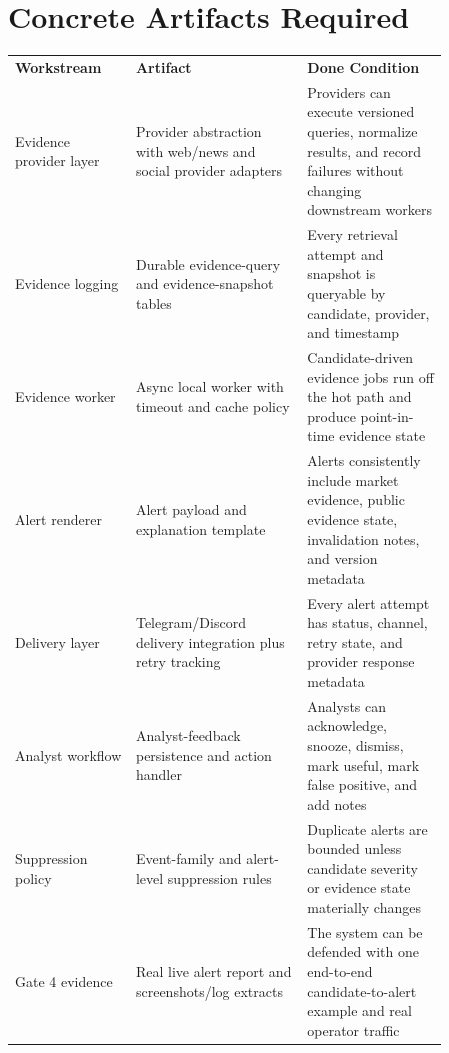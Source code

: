 \documentclass{article}
\begin{document}
\section*{Concrete Artifacts Required}
\begin{longtable}{p{0.24\linewidth}p{0.34\linewidth}p{0.28\linewidth}}
\textbf{Workstream} & \textbf{Artifact} & \textbf{Done Condition} \\
Evidence provider layer & Provider abstraction with web/news and social provider adapters & Providers can execute versioned queries, normalize results, and record failures without changing downstream workers \\
Evidence logging & Durable evidence-query and evidence-snapshot tables & Every retrieval attempt and snapshot is queryable by candidate, provider, and timestamp \\
Evidence worker & Async local worker with timeout and cache policy & Candidate-driven evidence jobs run off the hot path and produce point-in-time evidence state \\
Alert renderer & Alert payload and explanation template & Alerts consistently include market evidence, public evidence state, invalidation notes, and version metadata \\
Delivery layer & Telegram/Discord delivery integration plus retry tracking & Every alert attempt has status, channel, retry state, and provider response metadata \\
Analyst workflow & Analyst-feedback persistence and action handler & Analysts can acknowledge, snooze, dismiss, mark useful, mark false positive, and add notes \\
Suppression policy & Event-family and alert-level suppression rules & Duplicate alerts are bounded unless candidate severity or evidence state materially changes \\
Gate 4 evidence & Real live alert report and screenshots/log extracts & The system can be defended with one end-to-end candidate-to-alert example and real operator traffic \\
\end{longtable}
\end{document}
